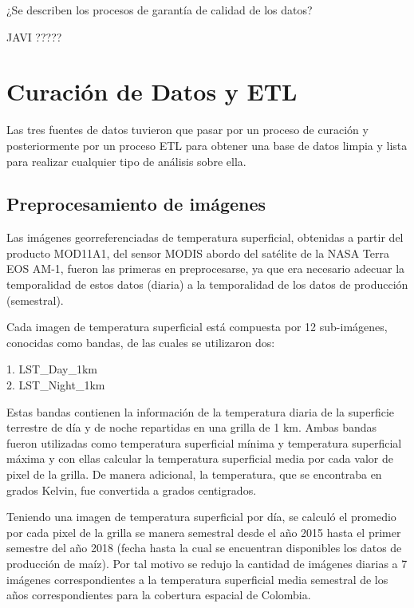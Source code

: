 \documentclass[12pt, spanish]{article}
\begin{document}
\begin{shaded}
¿Se describen los procesos de garantía de calidad de los datos?
\end{shaded}
JAVI ?????



\section{Curación de Datos y ETL}

Las tres fuentes de datos tuvieron que pasar por un proceso de curación y posteriormente por un proceso ETL para obtener una base de datos limpia y lista para realizar cualquier tipo de análisis sobre ella.

\subsection{Preprocesamiento de imágenes}

Las imágenes georreferenciadas de temperatura superficial, obtenidas a partir del producto MOD11A1, del sensor MODIS abordo del satélite de la NASA Terra EOS AM-1, fueron las primeras en preprocesarse, ya que era necesario adecuar la temporalidad de estos datos (diaria) a la temporalidad de los datos de producción (semestral).

Cada imagen de temperatura superficial está compuesta por 12 sub-imágenes, conocidas como bandas, de las cuales se utilizaron dos:

1. LST\_Day\_1km \\
2. LST\_Night\_1km

Estas bandas contienen la información de la temperatura diaria de la superficie terrestre de día y de noche repartidas en una grilla de 1 km. Ambas bandas fueron utilizadas como temperatura superficial mínima y temperatura superficial máxima y con ellas calcular la temperatura superficial media por cada valor de pixel de la grilla. De manera adicional, la temperatura, que se encontraba en grados Kelvin, fue convertida a grados centigrados.

Teniendo una imagen de temperatura superficial por día, se calculó el promedio por cada pixel de la grilla se manera semestral desde el año 2015 hasta el primer semestre del año 2018 (fecha hasta la cual se encuentran disponibles los datos de producción de maíz). Por tal motivo se redujo la cantidad de imágenes diarias a 7 imágenes correspondientes a la temperatura superficial media semestral de los años correspondientes para la cobertura espacial de Colombia.
\end{document}
